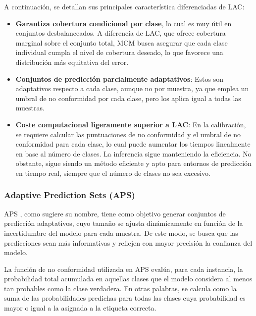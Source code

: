 A continuación, se detallan sus principales característica diferenciadas de LAC:

\begin{itemize}

    \item \textbf{Garantiza cobertura condicional por clase}, lo cual es muy útil en conjuntos desbalanceados.
    A diferencia de LAC, que ofrece cobertura marginal sobre el conjunto total, MCM busca asegurar que cada
    clase individual cumpla el nivel de cobertura deseado, lo que favorece una distribución más equitativa 
    del error.
    
    \item \textbf{Conjuntos de predicción parcialmente adaptativos}: Estos son adaptativos respecto a cada 
    clase, aunque no por muestra, ya que emplea un umbral de no conformidad por cada clase, pero los aplica
    igual a todas las muestras.  

    \item \textbf{Coste computacional ligeramente superior a LAC}: En la calibración, se requiere calcular 
    las puntuaciones de no conformidad y el umbral de no conformidad para cada clase, lo cual puede aumentar 
    los tiempos linealmente en base al número de clases. La inferencia sigue manteniendo la eficiencia.
    No obstante, sigue siendo un método eficiente y apto 
    para entornos de predicción en tiempo real, siempre que el número de clases no sea excesivo.

\end{itemize}


\subsubsection{Adaptive Prediction Sets (APS)}

APS \cite{romano2020}, como sugiere su nombre, tiene como objetivo generar conjuntos de predicción 
adaptativos, cuyo tamaño se ajusta dinámicamente en función de la incertidumbre del modelo para cada muestra. 
De este modo, se busca que las predicciones sean más informativas y reflejen con mayor precisión la confianza 
del modelo.

La función de no conformidad utilizada en APS evalúa, para cada instancia, la probabilidad total acumulada en 
aquellas clases que el modelo considera al menos tan probables como la clase verdadera.
En otras palabras, se calcula como la suma de las probabilidades predichas para todas las clases cuya 
probabilidad es mayor o igual a la asignada a la etiqueta correcta.



